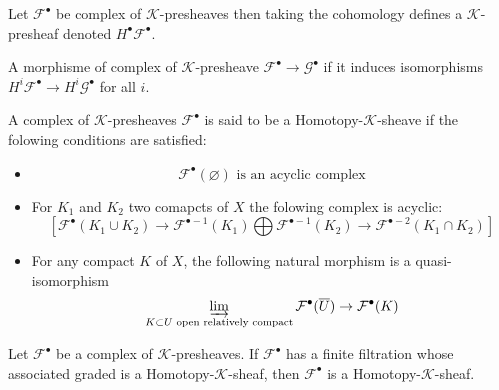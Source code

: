 \begin{definition}\label{def:cohomology_of_k-prsh}
    Let $\mathcal{F}^{\bullet}$ be complex of $\mathcal{K}$-presheaves then taking the cohomology defines a $\mathcal{K}$-presheaf denoted $H^{\bullet}\mathcal{F}^{\bullet}$.
\end{definition}

\begin{definition}\label{def:quasi_iso_of_complex_of_k-prsh}
    A morphisme of complex of $\mathcal{K}$-presheave $\mathcal{F}^{\bullet}\to\mathcal{G}^{\bullet}$ if it induces isomorphisms $H^i\mathcal{F}^{\bullet}\to H^i\mathcal{G}^{\bullet}$ for all $i$.
\end{definition}

\begin{definition}\label{def:homotopy_k_sheaf}
    A complex of $\mathcal{K}$-presheaves $\mathcal{F}^{\bullet}$ is said to be a Homotopy-$\mathcal{K}$-sheave if the folowing conditions are satisfied:\begin{itemize}
        \item\begin{equation}\label{axiom:hKsh1}
            \mathcal{F}^{\bullet}(\varnothing) \text{ is an acyclic complex}
        \end{equation}
        \item For $K_1$ and $K_2$ two comapcts of $X$ the folowing complex is acyclic:\begin{equation}\label{axiom:hKsh2}
             [\mathcal{F}^{\bullet}(K_1\cup K_2)\to \mathcal{F}^{\bullet-1}(K_1)\bigoplus\mathcal{F}^{\bullet-1}(K_2)\to \mathcal{F}^{\bullet-2}(K_1\cap K_2) ]
        \end{equation}
        \item For any compact $K$ of $X$, the following natural morphism is a quasi-isomorphism \begin{equation}\label{axiom:hKsh3}
            \varinjlim\limits_{K\subset U\text{ open relatively compact}}\mathcal{F}^{\bullet}(\overline{U})\to \mathcal{F}^{\bullet}(K)
        \end{equation}
    \end{itemize}
\end{definition}

\begin{lemma}\label{lem:homotpy_k_sheaves_stable_by_extension}
    Let $\mathcal{F}^{\bullet}$ be a complex of $\mathcal{K}$-presheaves. If $\mathcal{F}^{\bullet}$ has a finite filtration whose associated graded is a Homotopy-$\mathcal{K}$-sheaf, then $\mathcal{F}^{\bullet}$ is a Homotopy-$\mathcal{K}$-sheaf.
\end{lemma}

